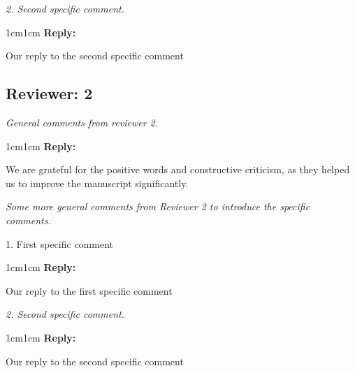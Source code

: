 \documentclass[rightcolwidth=.38]{ugent-note}
\newenvironment{reviewer}{\itshape}{}
\newenvironment{reply}{%
    \begin{adjustwidth}{1cm}{1cm}%
    \color{grayreply}\textbf{Reply:\ }%
    \ignorespaces%
}{\end{adjustwidth}}
\begin{document}
\begin{minipage}{\linewidth}
    \begin{reviewer}
        2. Second specific comment.
    \end{reviewer}

    \begin{reply}
        Our reply to the second specific comment
    \end{reply}
\end{minipage}

\subsection*{Reviewer: 2}

\begin{minipage}{\linewidth}
    \begin{reviewer}
        General comments from reviewer 2.
    \end{reviewer}

    \begin{reply}
        We are grateful for the positive words and constructive criticism, as they helped us to improve the manuscript significantly.
    \end{reply}
\end{minipage}


\begin{minipage}{\linewidth}
    \begin{reviewer}
        Some more general comments from Reviewer 2 to introduce the specific comments.

        1. First specific comment
    \end{reviewer}

    \begin{reply}
        Our reply to the first specific comment
    \end{reply}
\end{minipage}


\begin{minipage}{\linewidth}
    \begin{reviewer}
        2. Second specific comment.
    \end{reviewer}

    \begin{reply}
        Our reply to the second specific comment
    \end{reply}
\end{minipage}
\end{document}
